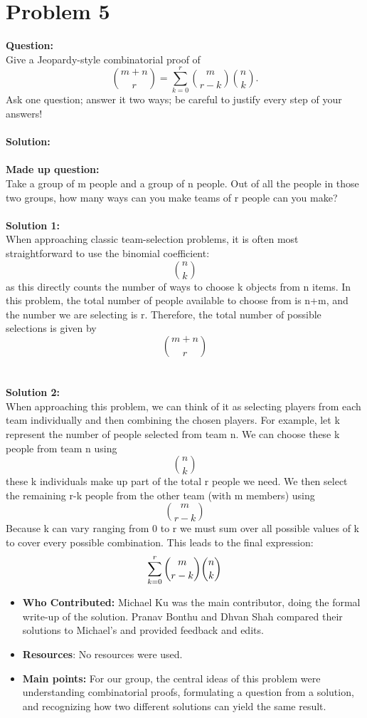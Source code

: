 \documentclass{article}
\begin{document}
\section*{Problem 5}
\textbf{Question:}\\ Give a Jeopardy-style combinatorial proof of
\[
    \binom{m+n}{r} = \sum_{k=0}^{r} \binom{m}{r-k}\binom{n}{k}.
\]
Ask one question; answer it two ways; be careful to justify every step of your answers! \\\\
\textbf{Solution:}\\\\
\textbf{Made up question:}\\ Take a group of m people and a group of n people. Out of all the people in those two groups, how many ways can you make teams of r people can you make? \\\\
\textbf{Solution 1:}\\ When approaching classic team-selection problems, it is often most straightforward to use the binomial coefficient: \[\binom{n}{k}\] as this directly counts the number of ways to choose  k objects from n items. In this problem, the total number of people available to choose from is
n+m, and the number we are selecting is r. Therefore, the total number of possible selections is given by \[\binom{m+n}{r}\] \\\\
\textbf{Solution 2:}\\
When approaching this problem, we can think of it as selecting players from each team individually and then combining the chosen players. For example, let k represent the number of people selected from team n. We can choose these
k people from team n using \[\binom{n}{k}\] these k individuals make up part of the total r people we need. We then select the remaining r-k people from the other team (with m members) using \[\binom{m}{r-k}\] Because k can vary ranging from 0 to r we must sum over all possible values of k to cover every possible combination. This leads to the final expression:
\[\sum_{k=0}^{r}\binom{m}{r-k}\*\binom{n}{k}\]

\begin{itemize}
    \item \textbf{Who Contributed:} Michael Ku was the main contributor, doing the formal write-up of the solution. Pranav Bonthu and Dhvan Shah compared their solutions to Michael's and provided feedback and edits.
    \item \textbf{Resources}: No resources were used.
    \item \textbf{Main points:}  For our group, the central ideas of this problem were understanding combinatorial proofs, formulating a question from a solution, and recognizing how two different solutions can yield the same result.
\end{itemize}
\end{document}
